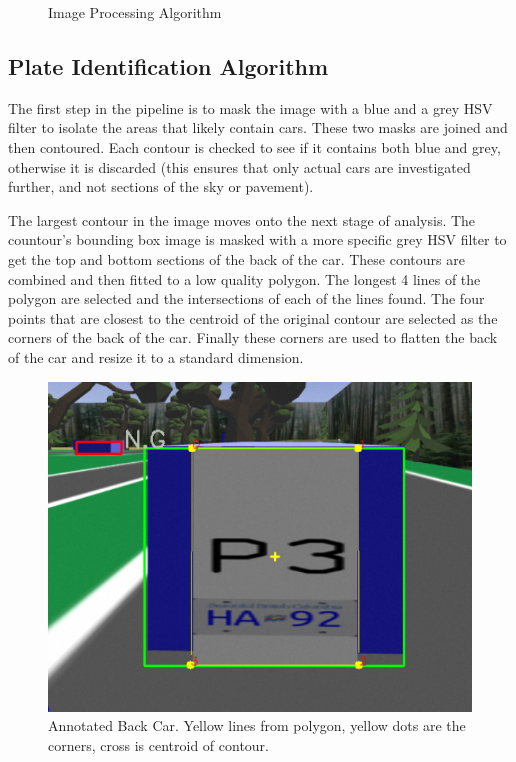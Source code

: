 \documentclass[titlepage, twocolumn]{article}
\begin{document}
\begin{figure}[H]
\caption{Image Processing Algorithm}
\label{fig:platepipeline}
\end{figure}

\subsection{Plate Identification Algorithm}

The first step in the pipeline is to mask the image with a blue and a grey HSV filter to isolate the areas that likely contain cars. These two masks are joined and then contoured. Each contour is checked to see if it contains both blue and grey, otherwise it is discarded (this ensures that only actual cars are investigated further, and not sections of the sky or pavement). 

The largest contour in the image moves onto the next stage of analysis. The countour's bounding box image is masked with a more specific grey HSV filter to get the top and bottom sections of the back of the car. These contours are combined and then fitted to a low quality polygon. The longest 4 lines of the polygon are selected and the intersections of each of the lines found. The four points that are closest to the centroid of the original contour are selected as the corners of the back of the car. Finally these corners are used to flatten the back of the car and resize it to a standard dimension.

\begin{figure}[H]
\centering
\includegraphics[width=\linewidth]{Annotated back car.png}
\caption{Annotated Back Car. Yellow lines from polygon, yellow dots are the corners, cross is centroid of contour.}
\label{fig:annotatedbackcar}
\end{figure}
\end{document}
